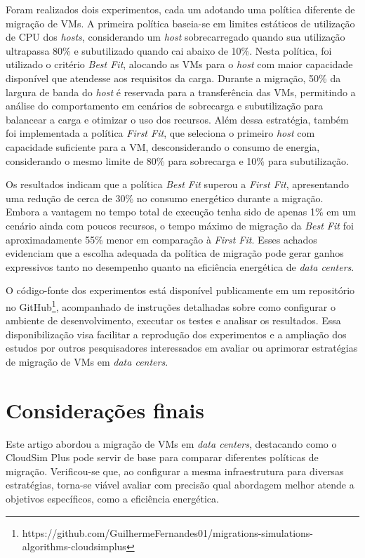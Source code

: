 \documentclass[12pt]{article}
\begin{document}
Foram realizados dois experimentos, cada um adotando uma política diferente de migração de VMs. A primeira política baseia-se em limites estáticos de utilização de CPU dos \textit{hosts}, considerando um \textit{host} sobrecarregado quando sua utilização ultrapassa 80\% e subutilizado quando cai abaixo de 10\%. Nesta política, foi utilizado o critério \textit{Best Fit}, alocando as VMs para o \textit{host} com maior capacidade disponível que atendesse aos requisitos da carga. Durante a migração, 50\% da largura de banda do \textit{host} é reservada para a transferência das VMs, permitindo a análise do comportamento em cenários de sobrecarga e subutilização para balancear a carga e otimizar o uso dos recursos. Além dessa estratégia, também foi implementada a política \textit{First Fit}, que seleciona o primeiro \textit{host} com capacidade suficiente para a VM, desconsiderando o consumo de energia, considerando o mesmo limite de 80\% para sobrecarga e 10\% para subutilização.

Os resultados indicam que a política \textit{Best Fit} superou a \textit{First Fit}, apresentando uma redução de cerca de 30\% no consumo energético durante a migração. Embora a vantagem no tempo total de execução tenha sido de apenas 1\% em um cenário ainda com poucos recursos, o tempo máximo de migração da \textit{Best Fit} foi aproximadamente 55\% menor em comparação à \textit{First Fit}. Esses achados evidenciam que a escolha adequada da política de migração pode gerar ganhos expressivos tanto no desempenho quanto na eficiência energética de \textit{data centers}.

O código-fonte dos experimentos está disponível publicamente em um repositório no GitHub\footnote{https://github.com/GuilhermeFernandes01/migrations-simulations-algorithms-cloudsimplus}, acompanhado de instruções detalhadas sobre como configurar o ambiente de desenvolvimento, executar os testes e analisar os resultados. Essa disponibilização visa facilitar a reprodução dos experimentos e a ampliação dos estudos por outros pesquisadores interessados em avaliar ou aprimorar estratégias de migração de VMs em \textit{data centers}.

\section{Considerações finais}

Este artigo abordou a migração de VMs em \textit{data centers}, destacando como o CloudSim Plus pode servir de base para comparar diferentes políticas de migração. Verificou-se que, ao configurar a mesma infraestrutura para diversas estratégias, torna-se viável avaliar com precisão qual abordagem melhor atende a objetivos específicos, como a eficiência energética.
\end{document}
